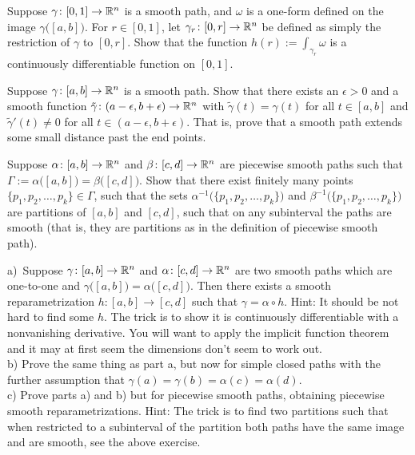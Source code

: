 \begin{exercise}
Suppose $\gamma \colon [0,1] \to {\mathbb{R}}^n$ is a smooth path, and
$\omega$ is a one-form defined on the image $\gamma\bigl([a,b]\bigr)$.
For $r \in [0,1]$, let $\gamma_r \colon [0,r] \to {\mathbb{R}}^n$ be defined
as simply the restriction of $\gamma$ to $[0,r]$.  Show that the
function $h(r) := \int_{\gamma_r} \omega$ is a continuously
differentiable function on $[0,1]$.
\end{exercise}

\begin{exercise}
Suppose $\gamma \colon [a,b] \to {\mathbb{R}}^n$ is a smooth path.
Show that there exists an $\epsilon > 0$ and a smooth function
$\tilde{\gamma} \colon (a-\epsilon,b+\epsilon) \to {\mathbb{R}}^n$
with $\tilde{\gamma}(t) = \gamma(t)$ for all $t \in [a,b]$
and $\tilde{\gamma}'(t) \not= 0$ for all $t \in 
(a-\epsilon,b+\epsilon)$.  That is, prove that a smooth path extends
some small distance past the end points.
\end{exercise}

\begin{exercise} 
Suppose $\alpha \colon [a,b] \to {\mathbb{R}}^n$ and
$\beta \colon [c,d] \to {\mathbb{R}}^n$ are piecewise smooth paths such that
$\Gamma := \alpha\bigl([a,b]\bigr) = \beta\bigl([c,d]\bigr)$.
Show that there exist finitely many points
$\{ p_1,p_2,\ldots,p_k\} \in \Gamma$, such that
the sets
$\alpha^{-1}\bigl( \{ p_1,p_2,\ldots,p_k\} \bigr)$
and
$\beta^{-1}\bigl( \{ p_1,p_2,\ldots,p_k\} \bigr)$
are partitions of $[a,b]$ and $[c,d]$, such that on any subinterval
the paths are smooth (that is, they are partitions as in the definition
of piecewise smooth path).
\end{exercise}

\begin{exercise}
a)~Suppose $\gamma \colon [a,b] \to {\mathbb{R}}^n$ and $\alpha \colon [c,d] \to {\mathbb{R}}^n$
are two smooth paths which are one-to-one and
$\gamma\bigl([a,b]\bigr) = \alpha\bigl([c,d]\bigr)$.  Then
there exists a smooth reparametrization $h \colon [a,b] \to [c,d]$
such that $\gamma = \alpha \circ h$.  Hint: It should be not hard to find
some $h$.  The trick is to show it is continuously differentiable
with a nonvanishing derivative.  You will want to apply the implicit function
theorem and it may at first seem the dimensions don't seem to work out.
\\
b) Prove the same thing as part a, but now for simple closed paths with the
further assumption that $\gamma(a) = \gamma(b) = \alpha(c) = \alpha(d)$.
\\
c) Prove parts a) and b) but for piecewise smooth paths, obtaining
piecewise smooth reparametrizations.  Hint: The trick is to find two
partitions such that when restricted to a subinterval of the partition
both paths have the same image and are smooth, see the above exercise.
\end{exercise}

